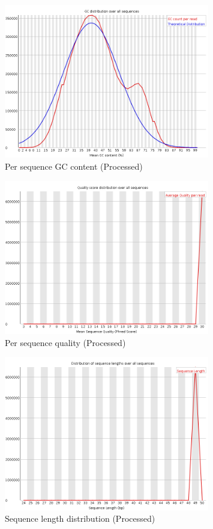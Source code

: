 \documentclass[UTF8]{ctexart}
\begin{document}
\begin{figure}[!htb]
	\centering
	\includegraphics[width=0.8\textwidth]{img/SRR14325859_FastQC_Processed_img/per_sequence_gc_content.png}	
	\caption{Per sequence GC content (Processed)\protect}    
\end{figure}

\begin{figure}[!htb]
	\centering
	\includegraphics[width=0.8\textwidth]{img/SRR14325859_FastQC_Processed_img/per_sequence_quality.png}	
	\caption{Per sequence quality (Processed)\protect}    
\end{figure}

\begin{figure}[!htb]
	\centering
	\includegraphics[width=0.8\textwidth]{img/SRR14325859_FastQC_Processed_img/sequence_length_distribution.png}	
	\caption{Sequence length distribution (Processed)\protect}    
\end{figure}
\end{document}
